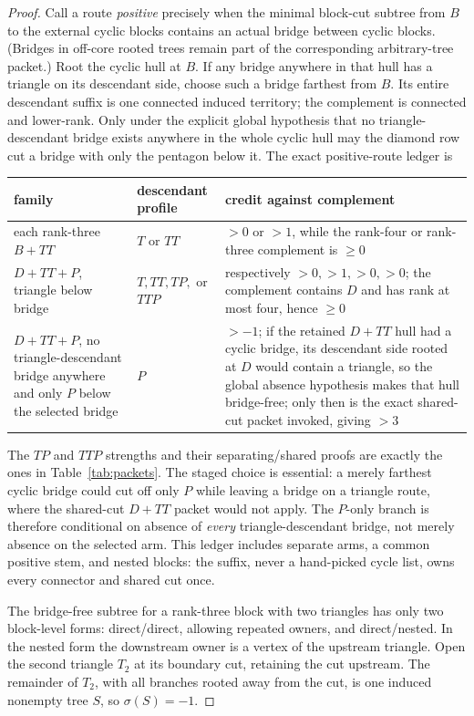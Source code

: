\documentclass[11pt]{article}
\theoremstyle{remark}
\newcommand{\sig}{\sigma}
\begin{document}
\begin{proof}
Call a route \emph{positive} precisely when the minimal block-cut subtree from
$B$ to the external cyclic blocks contains an actual bridge between cyclic
blocks.  (Bridges in off-core rooted trees remain part of the corresponding
arbitrary-tree packet.)  Root the cyclic hull at $B$.  If any bridge anywhere
in that hull has a triangle on its descendant side, choose such a bridge
farthest from $B$.  Its entire descendant suffix is one connected induced
territory; the complement is connected and lower-rank.  Only under the explicit
global hypothesis that no triangle-descendant bridge exists anywhere in the
whole cyclic hull may the diamond row cut a bridge with only the pentagon below
it.  The exact positive-route ledger is
\begin{center}
\small
\begin{tabular}{p{3.2cm}p{4.0cm}p{5.8cm}}
\toprule
family&descendant profile&credit against complement\\\midrule
each rank-three $B+TT$&$T$ or $TT$&$>0$ or $>1$, while the rank-four or
rank-three complement is $\ge0$\\
$D+TT+P$, triangle below bridge&$T,TT,TP,$ or $TTP$&respectively $>0,>1,>0,>0$;
the complement contains $D$ and has rank at most four, hence $\ge0$\\
$D+TT+P$, no triangle-descendant bridge anywhere and only $P$ below the
selected bridge&$P$&$>-1$; if the retained $D+TT$ hull had a cyclic bridge, its
descendant side rooted at $D$ would contain a triangle, so the global absence
hypothesis makes that hull bridge-free; only then is the exact shared-cut
packet invoked, giving $>3$\\
\bottomrule
\end{tabular}
\end{center}
The $TP$ and $TTP$ strengths and their separating/shared proofs are exactly the
ones in Table~\ref{tab:packets}.  The staged choice is essential: a merely
farthest cyclic bridge could cut off only $P$ while leaving a bridge on a
triangle route, where the shared-cut $D+TT$ packet would not apply.  The
$P$-only branch is therefore conditional on absence of \emph{every}
triangle-descendant bridge, not merely absence on the selected arm.  This
ledger includes separate arms, a common positive stem, and nested blocks: the
suffix, never a hand-picked cycle list, owns every connector and shared cut
once.

The bridge-free subtree for a rank-three block with two triangles has only two
block-level forms:
direct/direct, allowing repeated owners, and direct/nested.  In the nested form
the downstream owner is a vertex of the upstream triangle.  Open the second
triangle $T_2$ at its boundary cut, retaining the cut upstream.  The remainder
of $T_2$, with all branches rooted away from the cut, is one induced nonempty
tree $S$, so $\sig(S)=-1$.


\end{proof}
\end{document}
